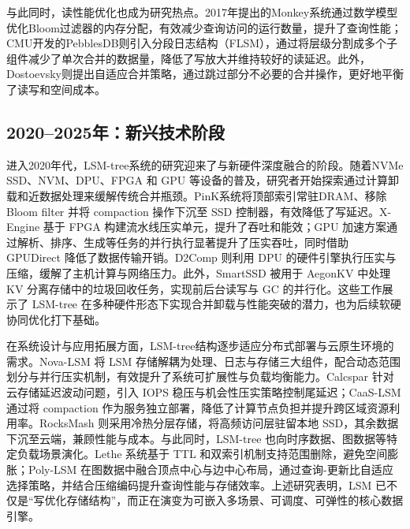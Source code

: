 \documentclass[lang=cn,11pt,a4paper]{elegantpaper}
\begin{document}
	与此同时，读性能优化也成为研究热点。2017年提出的Monkey系统通过数学模型优化Bloom过滤器的内存分配，有效减少查询访问的运行数量，提升了查询性能\cite{DBLP:conf/sigmod/DayanAI17}；CMU开发的PebblesDB则引入分段日志结构（FLSM），通过将层级分割成多个子组件减少了单次合并的数据量，降低了写放大并维持较好的读延迟\cite{DBLP:conf/sosp/RajuKCA17}。此外，Dostoevsky则提出自适应合并策略，通过跳过部分不必要的合并操作，更好地平衡了读写和空间成本\cite{DBLP:conf/sigmod/DayanI18}。
	
	\subsection{2020–2025年：新兴技术阶段}
	进入2020年代，LSM-tree系统的研究迎来了与新硬件深度融合的阶段。随着NVMe SSD、NVM、DPU、FPGA 和 GPU 等设备的普及，研究者开始探索通过计算卸载和近数据处理来缓解传统合并瓶颈。PinK系统将顶部索引常驻DRAM、移除 Bloom filter 并将 compaction 操作下沉至 SSD 控制器，有效降低了写延迟\cite{DBLP:conf/usenix/ImBCAL20}。X-Engine 基于 FPGA 构建流水线压实单元，提升了吞吐和能效\cite{DBLP:conf/fast/ZhangWCXYHZH0CH20}；GPU 加速方案通过解析、排序、生成等任务的并行执行显著提升了压实吞吐，同时借助 GPUDirect 降低了数据传输开销\cite{zhou2024gpu}。D2Comp 则利用 DPU 的硬件引擎执行压实与压缩，缓解了主机计算与网络压力\cite{DBLP:journals/taco/DingZLLXWZ24}。此外，SmartSSD 被用于 AegonKV 中处理 KV 分离存储中的垃圾回收任务，实现前后台读写与 GC 的并行化\cite{DBLP:conf/fast/DuanFLL0L25}。这些工作展示了 LSM-tree 在多种硬件形态下实现合并卸载与性能突破的潜力，也为后续软硬协同优化打下基础。
	
	在系统设计与应用拓展方面，LSM-tree结构逐步适应分布式部署与云原生环境的需求。Nova-LSM 将 LSM 存储解耦为处理、日志与存储三大组件，配合动态范围划分与并行压实机制，有效提升了系统可扩展性与负载均衡能力\cite{DBLP:conf/sigmod/HuangG21}。Calcspar 针对云存储延迟波动问题，引入 IOPS 稳压与机会性压实策略控制尾延迟\cite{DBLP:conf/usenix/ZhouZCXWWLZW23}；CaaS-LSM 通过将 compaction 作为服务独立部署，降低了计算节点负担并提升跨区域资源利用率\cite{DBLP:journals/pacmmod/YuGZTW024}。RocksMash 则采用冷热分层存储，将高频访问层驻留本地 SSD，其余数据下沉至云端，兼顾性能与成本\cite{DBLP:conf/cluster/XuZWLCZALTX21}。与此同时，LSM-tree 也向时序数据、图数据等特定负载场景演化。Lethe 系统基于 TTL 和双索引机制支持范围删除，避免空间膨胀\cite{DBLP:conf/sigmod/SarkarPSA20}；Poly-LSM 在图数据中融合顶点中心与边中心布局，通过查询-更新比自适应选择策略，并结合压缩编码提升查询性能与存储效率\cite{DBLP:journals/pacmmod/MoLWL25}。上述研究表明，LSM 已不仅是“写优化存储结构”，而正在演变为可嵌入多场景、可调度、可弹性的核心数据引擎。
	
\end{document}
